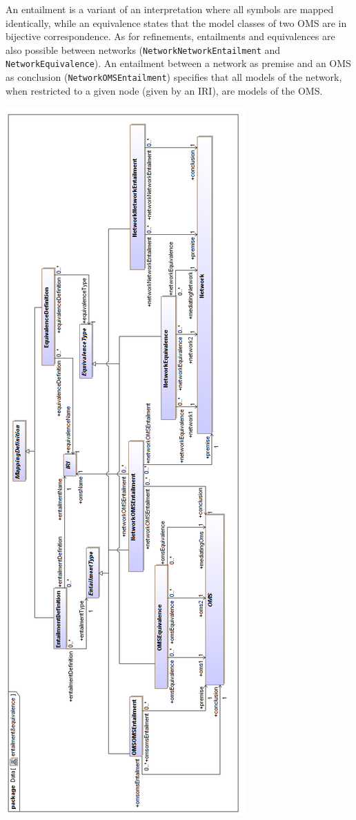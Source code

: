 \documentclass[10pt,fleqn,final]{scrreprt}
\newcommand*{\syntax}[1]{\texttt{#1}}
\newenvironment{definitions}[0]{\medskip }{}
\begin{document}
\begin{definitions}
An entailment is a variant of an interpretation where all symbols are
mapped identically, while an equivalence states that the model classes
of two OMS are in bijective correspondence. As for refinements,
entailments and equivalences are also possible between networks
(\syntax{NetworkNetworkEntailment} and \syntax{NetworkEquivalence}).
An entailment between a network as premise and an OMS as conclusion
(\syntax{NetworkOMSEntailment}) specifies that all models of the
network, when restricted to a given node (given by an IRI), are
models of the OMS.

\begin{center}
\includegraphics[scale=0.47]{mof/entailment&equivalence.png}
\end{center}







\end{definitions}
\end{document}
